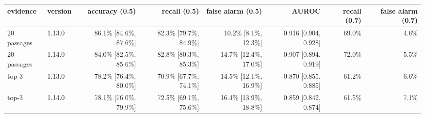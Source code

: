 \begin{tabular}{llrrrrrr}
\toprule
evidence & version & accuracy (0.5) & recall (0.5) & false alarm (0.5) & AUROC & recall (0.7) & false alarm (0.7) \\
\midrule
20 passages & 1.13.0 & 86.1\% [84.6\%, 87.6\%] & 82.3\% [79.7\%, 84.9\%] & 10.2\% [8.1\%, 12.3\%] & 0.916 [0.904, 0.928] & 69.0\% & 4.6\% \\
20 passages & 1.14.0 & 84.0\% [82.5\%, 85.6\%] & 82.8\% [80.3\%, 85.3\%] & 14.7\% [12.4\%, 17.0\%] & 0.907 [0.894, 0.919] & 72.0\% & 5.5\% \\
top-3 & 1.13.0 & 78.2\% [76.4\%, 80.0\%] & 70.9\% [67.7\%, 74.1\%] & 14.5\% [12.1\%, 16.9\%] & 0.870 [0.855, 0.885] & 61.2\% & 6.6\% \\
top-3 & 1.14.0 & 78.1\% [76.0\%, 79.9\%] & 72.5\% [69.1\%, 75.6\%] & 16.4\% [13.9\%, 18.8\%] & 0.859 [0.842, 0.874] & 61.5\% & 7.1\% \\
\bottomrule
\end{tabular}
